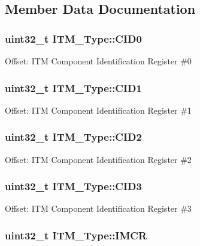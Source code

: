 \subsection{Member Data Documentation}
\hypertarget{struct_i_t_m___type_a413f3bb0a15222e5f38fca4baeef14f6}{
\subsubsection[{C\-I\-D0}]{ uint32\-\_\-t I\-T\-M\-\_\-\-Type\-::\-C\-I\-D0}}\label{struct_i_t_m___type_a413f3bb0a15222e5f38fca4baeef14f6}
Offset\-: I\-T\-M Component Identification Register \#0 \hypertarget{struct_i_t_m___type_a5f7d524b71f49e444ff0d1d52b3c3565}{
\subsubsection[{C\-I\-D1}]{ uint32\-\_\-t I\-T\-M\-\_\-\-Type\-::\-C\-I\-D1}}\label{struct_i_t_m___type_a5f7d524b71f49e444ff0d1d52b3c3565}
Offset\-: I\-T\-M Component Identification Register \#1 \hypertarget{struct_i_t_m___type_adee4ccce1429db8b5db3809c4539f876}{
\subsubsection[{C\-I\-D2}]{ uint32\-\_\-t I\-T\-M\-\_\-\-Type\-::\-C\-I\-D2}}\label{struct_i_t_m___type_adee4ccce1429db8b5db3809c4539f876}
Offset\-: I\-T\-M Component Identification Register \#2 \hypertarget{struct_i_t_m___type_a0e7aa199619cc7ac6baddff9600aa52e}{
\subsubsection[{C\-I\-D3}]{ uint32\-\_\-t I\-T\-M\-\_\-\-Type\-::\-C\-I\-D3}}\label{struct_i_t_m___type_a0e7aa199619cc7ac6baddff9600aa52e}
Offset\-: I\-T\-M Component Identification Register \#3 \hypertarget{struct_i_t_m___type_ab2e87d8bb0e3ce9b8e0e4a6a6695228a}{
\subsubsection[{I\-M\-C\-R}]{ uint32\-\_\-t I\-T\-M\-\_\-\-Type\-::\-I\-M\-C\-R}}\label{struct_i_t_m___type_ab2e87d8bb0e3ce9b8e0e4a6a6695228a}
